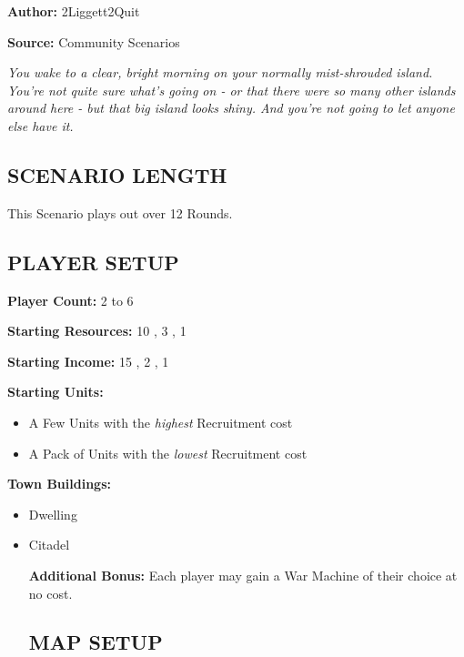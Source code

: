 
\begin{multicols*}{2}

\textbf{Author:} 2Liggett2Quit

\textbf{Source:} Community Scenarios

\textit{You wake to a clear, bright morning on your normally mist-shrouded island. You're not quite sure what's going on - or that there were so many other islands around here - but that big island looks shiny. And you're not going to let anyone else have it.}

\subsection*{\MakeUppercase{Scenario Length}}

This Scenario plays out over 12 Rounds.

\subsection*{\MakeUppercase{Player Setup}}
\textbf{Player Count:} 2 to 6

\textbf{Starting Resources:} 10 , 3 , 1 

\textbf{Starting Income:} 15 , 2 , 1 

\textbf{Starting Units:}
\begin{itemize}
  \item A Few  Units with the \textit{highest} Recruitment cost
  \item A Pack of  Units with the \textit{lowest} Recruitment cost
\end{itemize}

\textbf{Town Buildings:}
\begin{itemize}
  \item {} Dwelling
  \item Citadel

\textbf{Additional Bonus:} Each player may gain a War Machine of their choice at no cost.

\subsection*{\MakeUppercase{Map Setup}}


\end{itemize}
\end{multicols*}
